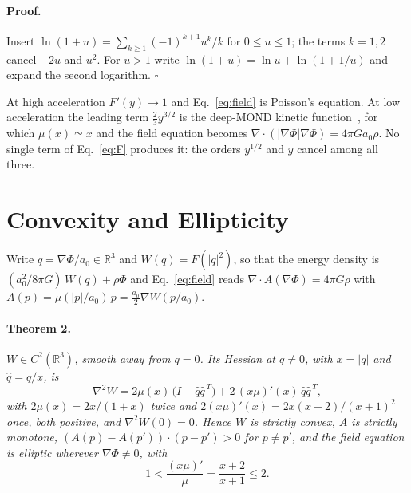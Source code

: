 \documentclass[twocolumn]{iopjournal}
\begin{document}
\paragraph{Proof.} Insert
$\ln(1+u) = \sum_{k\ge1} (-1)^{k+1}u^k/k$ for $0 \le u \le 1$; the
terms $k = 1, 2$ cancel $-2u$ and $u^2$. For $u > 1$ write
$\ln(1+u) = \ln u + \ln(1 + 1/u)$ and expand the second logarithm.
\hfill $\square$

\medskip
\noindent
At high acceleration $F'(y) \to 1$ and Eq.~\eqref{eq:field} is
Poisson's equation. At low acceleration the leading term
$\tfrac23 y^{3/2}$ is the deep-MOND kinetic
function~\cite{BekensteinMilgrom1984}, for which
$\mu(x) \simeq x$ and the field equation becomes
$\nabla\cdot(|\nabla\Phi|\nabla\Phi) = 4\pi G a_0 \rho$. No single
term of Eq.~\eqref{eq:F} produces it: the orders $y^{1/2}$ and $y$
cancel among all three.


\section*{Convexity and Ellipticity}

Write $q = \nabla\Phi/a_0 \in \mathbb{R}^3$ and
$W(q) = F(|q|^2)$, so that the energy density is
$(a_0^2/8\pi G)\,W(q) + \rho\Phi$ and Eq.~\eqref{eq:field} reads
$\nabla\cdot A(\nabla\Phi) = 4\pi G\rho$ with
$A(p) = \mu(|p|/a_0)\,p = \tfrac{a_0}{2}\nabla W(p/a_0)$.

\paragraph{Theorem 2.} \textit{$W \in C^2(\mathbb{R}^3)$, smooth
away from $q = 0$. Its Hessian at $q \neq 0$, with $x = |q|$ and
$\hat q = q/x$, is}
\begin{equation}
  \nabla^2 W = 2\mu(x)\,\big(I - \hat q\hat q^{\,T}\big)
             + 2\,(x\mu)'(x)\,\hat q\hat q^{\,T},
  \label{eq:hess}
\end{equation}
\textit{with $2\mu(x) = 2x/(1+x)$ twice and
$2(x\mu)'(x) = 2x(x+2)/(x+1)^2$ once, both positive, and
$\nabla^2 W(0) = 0$. Hence $W$ is strictly convex, $A$ is strictly
monotone, $(A(p) - A(p'))\cdot(p - p') > 0$ for $p \neq p'$, and
the field equation is elliptic wherever $\nabla\Phi \neq 0$, with}
\begin{equation}
  1 < \frac{(x\mu)'}{\mu} = \frac{x+2}{x+1} \le 2 .
  \label{eq:ratio}
\end{equation}
\end{document}
